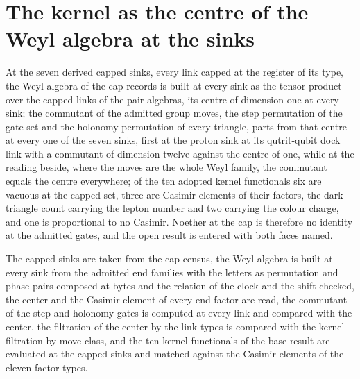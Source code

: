 \section{The kernel as the centre of the Weyl algebra at the sinks}\label{mod:IV-6-D538128-w-apkc}
\begin{chwall}\label{box:IV-6-D538128-w-apkc:1}
At the seven derived capped sinks, every link capped at the register of its type, the Weyl algebra of the cap records is built at every sink as the tensor product over the capped links of the pair algebras, its centre of dimension one at every sink; the commutant of the admitted group moves, the step permutation of the gate set and the holonomy permutation of every triangle, parts from that centre at every one of the seven sinks, first at the proton sink at its qutrit-qubit dock link with a commutant of dimension twelve against the centre of one, while at the reading beside, where the moves are the whole Weyl family, the commutant equals the centre everywhere; of the ten adopted kernel functionals six are vacuous at the capped set, three are Casimir elements of their factors, the dark-triangle count carrying the lepton number and two carrying the colour charge, and one is proportional to no Casimir. Noether at the cap is therefore no identity at the admitted gates, and the open result is entered with both faces named.
\end{chwall}
The capped sinks are taken from the cap census, the Weyl algebra is built at every sink from the admitted end families with the letters as permutation and phase pairs composed at bytes and the relation of the clock and the shift checked, the center and the Casimir element of every end factor are read, the commutant of the step and holonomy gates is computed at every link and compared with the center, the filtration of the center by the link types is compared with the kernel filtration by move class, and the ten kernel functionals of the base result are evaluated at the capped sinks and matched against the Casimir elements of the eleven factor types.


